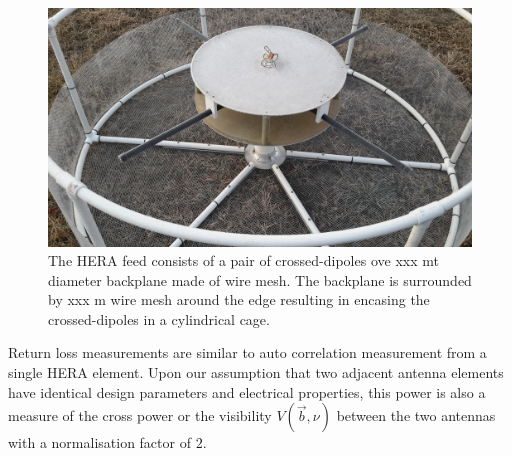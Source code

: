 \documentclass[twocolumn]{emulateapj}
\newcommand{\vis}{{V}}
\begin{document}
\begin{figure}
\centering
\includegraphics[trim={2cm 10cm 20cm 5cm},clip, totalheight=0.3\textheight]{plots/herafeed.jpg}
\vspace{1.0 em}
\caption{The HERA feed consists of a pair of crossed-dipoles ove xxx mt diameter backplane made of wire mesh. The backplane is surrounded by xxx m wire mesh around the edge resulting in encasing the crossed-dipoles in a cylindrical cage.}
\label{fig:herafeed}
\end{figure}


Return loss measurements are similar to auto correlation measurement from a single HERA element. Upon our assumption that two adjacent antenna elements have identical design parameters and electrical properties, this power is also a measure of the cross power or the visibility $\vis (\vec b, \nu)$ between the two antennas with a normalisation factor of $2$. 
\end{document}

